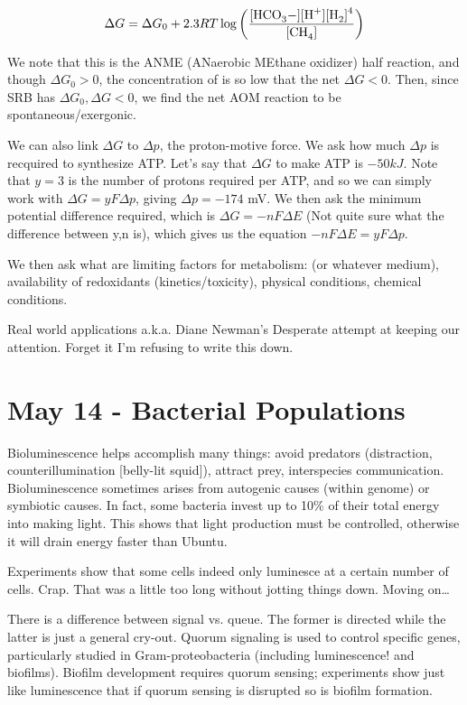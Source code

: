\documentclass[12pt]{article}
\begin{document}
$$\Delta G = \Delta G_0 + 2.3RT\log\left( \frac{\ce{[HCO3-][H+][H2]^4}}{\ce{[CH4]}} \right)$$

We note that this is the ANME (ANaerobic MEthane oxidizer) half reaction, and though $\Delta G_0 > 0$, the concentration of  is so low that the net $\Delta G < 0$. Then, since SRB has $\Delta G_0, \Delta G < 0$, we find the net AOM reaction to be spontaneous/exergonic. 

We can also link $\Delta G$ to $\Delta p$, the proton-motive force. We ask how much $\Delta p$ is recquired to synthesize ATP. Let's say that $\Delta G$ to make ATP is $-50 kJ$. Note that $y = 3$ is the number of protons required per ATP, and so we can simply work with $\Delta G = yF\Delta p$, giving $\Delta p = -174$ mV. We then ask the minimum potential difference required, which is $\Delta G = -nF\Delta E$ (Not quite sure what the difference between y,n is), which gives us the equation $-nF\Delta E = yF\Delta p$.

We then ask what are limiting factors for metabolism:  (or whatever medium), availability of redoxidants (kinetics/toxicity), physical conditions, chemical conditions. 

Real world applications a.k.a. Diane Newman's Desperate attempt at keeping our attention. Forget it I'm refusing to write this down.

\section*{May 14 - Bacterial Populations}

Bioluminescence helps accomplish many things: avoid predators (distraction, counterillumination [belly-lit squid]), attract prey, interspecies communication. Bioluminescence sometimes arises from autogenic causes (within genome) or symbiotic causes. In fact, some bacteria invest up to 10\% of their total energy into making light. This shows that light production must be controlled, otherwise it will drain energy faster than Ubuntu.

Experiments show that some cells indeed only luminesce at a certain number of cells. Crap. That was a little too long without jotting things down. Moving on\dots

There is a difference between signal vs. queue. The former is directed while the latter is just a general cry-out. Quorum signaling is used to control specific genes, particularly studied in Gram-proteobacteria (including luminescence! and biofilms). Biofilm development requires quorum sensing; experiments show just like luminescence that if quorum sensing is disrupted so is biofilm formation. 
\end{document}
